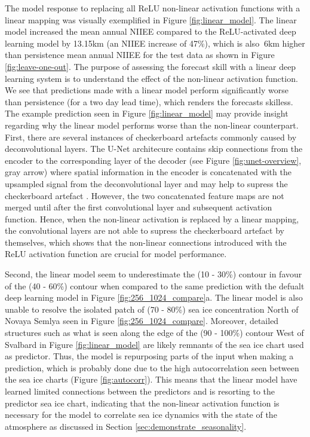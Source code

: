 \documentclass[../main/thesis]{subfiles}
\begin{document}
The model response to replacing all ReLU non-linear activation functions \citep{Nair2010} with a linear mapping was visually exemplified in Figure \ref{fig:linear_model}. The linear model increased the mean annual NIIEE compared to the ReLU-activated deep learning model by 13.15km (an NIIEE increase of 47\%), which is also $~ 6$km higher than persistence mean annual NIIEE for the test data as shown in Figure \ref{fig:leave-one-out}. The purpose of assessing the forecast skill with a linear deep learning system is to understand the effect of the non-linear activation function. We see that predictions made with a linear model perform significantly worse than persistence (for a two day lead time), which renders the forecasts skilless. The example prediction seen in Figure \ref{fig:linear_model} may provide insight regarding why the linear model performs worse than the non-linear counterpart. First, there are several instances of checkerboard artefacts commonly caused by deconvolutional layers. The U-Net architecure contains skip connections from the encoder to the corresponding layer of the decoder (see Figure \ref{fig:unet-overview}, gray arrow) where spatial information in the encoder is concatenated with the upsampled signal from the deconvolutional layer and may help to supress the checkerboard artefact \citep{Ronneberger2015}. However, the two concatenated feature maps are not merged until after the first convolutional layer and subsequent activation function. Hence, when the non-linear activation is replaced by a linear mapping, the convolutional layers are not able to supress the checkerboard artefact by themselves, which shows that the non-linear connections introduced with the ReLU activation function are crucial for model performance.

Second, the linear model seem to underestimate the (10 - 30\%) contour in favour of the (40 - 60\%) contour when compared to the same prediction with the defualt deep learning model in Figure \ref{fig:256_1024_compare}a. The linear model is also unable to resolve the isolated patch of (70 - 80\%) sea ice concentration North of Novaya Semlya seen in Figure \ref{fig:256_1024_compare}. Moreover, detailed structures such as what is seen along the edge of the (90 - 100\%) contour West of Svalbard in Figure \ref{fig:linear_model} are likely remnants of the sea ice chart used as predictor. Thus, the model is repurposing parts of the input when making a prediction, which is probably done due to the high autocorrelation seen between the sea ice charts (Figure \ref{fig:autocorr}). This means that the linear model have learned limited connections between the predictors and is resorting to the predictor sea ice chart, indicating that the non-linear activation function is necessary for the model to correlate sea ice dynamics with the state of the atmosphere as discussed in Section \ref{sec:demonstrate_seasonality}.
\end{document}

